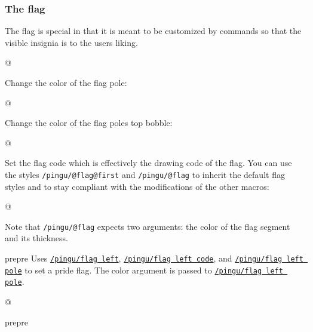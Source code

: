 \documentclass[parskip=half,english,numbers=noenddot,footnotes=nomultiple,oneside]{scrartcl}
\makeatletter
\def\lpingu#1{\lstinline[style=lstpingu,language=pingulang]'#1'}
\def\@showcase@pre{pre}
\let\@showcase@cur\@showcase@pre
\def\@toggle@showcase{\ifx\@showcase@cur\@showcase@pre\global\let\@showcase@cur\@empty\else \global\let\@showcase@cur\@showcase@pre\fi}
\newcommand*\keyref[2][/pingu/]{\hyperref[pk:#1#2]{\lpingu{#1#2}}}
\makeatother
\begin{document}
\subsubsection{The flag}
The flag is special in that it is meant to be customized by commands so that the visible insignia is to the users liking.

\begin{tcblisting}{@}
\begin{tikzpicture}
	\pingu[flag left=green]
\end{tikzpicture}
\end{tcblisting}
\endshowkeyexplain

Change the color of the flag pole:
	\begin{tcblisting}{@}
\begin{tikzpicture}
	\pingu[flag left, flag left pole=green]
\end{tikzpicture}
\end{tcblisting}
\endsubkeyexplain

Change the color of the flag poles top bobble:
	\begin{tcblisting}{@}
\begin{tikzpicture}
	\pingu[flag left, flag left bobble=green]
\end{tikzpicture}
\end{tcblisting}
\endsubkeyexplain

Set the flag code which is effectively the drawing code of the flag.
You can use the styles \lpingu{/pingu/@flag@first} and \lpingu{/pingu/@flag} to inherit the default flag styles and to stay compliant with the modifications of the other macros:
	\begin{tcblisting}{@}
\begin{tikzpicture}
	\pingu[flag left, flag left code={
	  \node[/pingu/@flag@first,
	  	/pingu/@flag={blue}{5mm}]
	  		(upper) at (0,0) {};
	  \node[below,/pingu/@flag={black}{4mm}]
	  	(lower) at (upper.south) {};
	}]
\end{tikzpicture}
\end{tcblisting}
Note that \lpingu{/pingu/@flag} expects two arguments: the color of the flag segment and its thickness.
\endsubkeyexplain

\@toggle@showcase %
	Uses \keyref{flag left}, \keyref{flag left code}, and \keyref{flag left pole} to set a pride flag. The color argument is passed to \keyref{flag left pole}.
\begin{tcblisting}{@}
\begin{tikzpicture}
	\pingu[pride flag left=green]
\end{tikzpicture}
\end{tcblisting}
\endshowkeyexplain
\@toggle@showcase %
\end{document}
